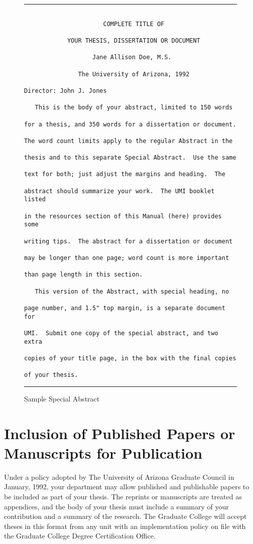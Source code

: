 \documentclass[draft]{ua-thesis}
\begin{document}
\begin{figure}
\hrule
\begin{verbatim}

                      COMPLETE TITLE OF

            YOUR THESIS, DISSERTATION OR DOCUMENT

                   Jane Allison Doe, M.S.

               The University of Arizona, 1992

Director: John J. Jones

   This is the body of your abstract, limited to 150 words

for a thesis, and 350 words for a dissertation or document.

The word count limits apply to the regular Abstract in the

thesis and to this separate Special Abstract.  Use the same

text for both; just adjust the margins and heading.  The

abstract should summarize your work.  The UMI booklet listed

in the resources section of this Manual (here) provides some

writing tips.  The abstract for a dissertation or document

may be longer than one page; word count is more important

than page length in this section.

   This version of the Abstract, with special heading, no

page number, and 1.5" top margin, is a separate document for

UMI.  Submit one copy of the special abstract, and two extra

copies of your title page, in the box with the final copies

of your thesis.

\end{verbatim}
\hrule
\caption{Sample Special Abstract} \label{f11}
\end{figure}

\appendix

\chapter{Inclusion of Published Papers or Manuscripts for Publication}

Under a policy adopted by The University of Arizona Graduate Council in
January, 1992, your department may allow published and publishable papers to
be included as part of your thesis. The reprints or manuscripts are treated
as appendices, and the body of your thesis must include a summary of your
contribution and a summary of the research. The Graduate College will accept
theses in this format from any unit with an implementation policy on file
with the Graduate College Degree Certification Office.
\end{document}

